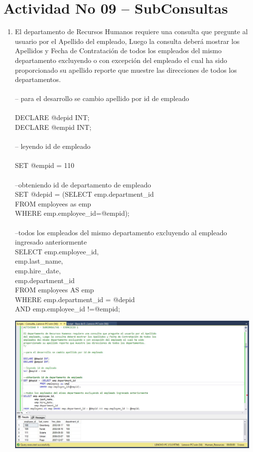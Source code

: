 \section{Actividad No 09 – SubConsultas} 
		
\begin{enumerate}[1.]
	\item El departamento de Recursos Humanos requiere una consulta que pregunte al usuario por el Apellido del empleado, Luego la consulta deber\'a mostrar los Apellidos y Fecha de Contrataci\'on de todos los empleados del mismo departamento excluyendo o con excepción del empleado el cual ha sido proporcionado su apellido reporte que muestre las direcciones de todos los departamentos.
	\\
\\-- para el desarrollo se cambio apellido por id de empleado
\\
\\DECLARE @depid INT;
\\DECLARE @empid INT;
\\
\\-- leyendo id de empleado
\\
\\SET @empid = 110
\\
\\--obteniendo id de departamento de empleado
\\SET @depid = (SELECT emp.department\_id
\\			FROM employees as emp
\\			WHERE emp.employee\_id=@empid);
\\
\\--todos los empleados del mismo departamento excluyendo al empleado ingresado anteriormente
\\SELECT emp.employee\_id,
\\		emp.last\_name,
\\		emp.hire\_date,
\\		emp.department\_id
\\FROM employees AS emp 
\\WHERE emp.department\_id = @depid 
\\AND emp.employee\_id !=@empid;\\

	\begin{center}
	\includegraphics[width=17cm]{./Imagenes/Actividad9-Ejercicio01} 
	\end{center}


\end{enumerate}
